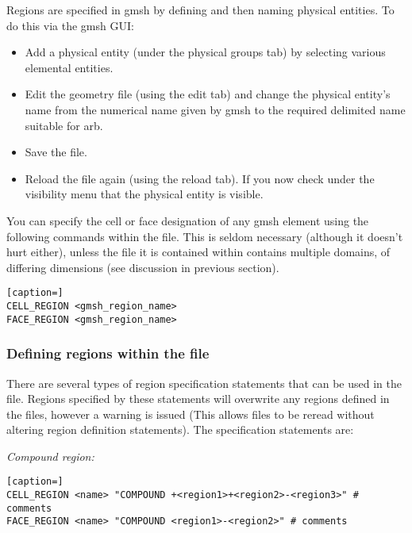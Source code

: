 Regions are specified in gmsh by defining and then naming physical entities.  To do this via the gmsh GUI:
%
\begin{itemize}
\item Add a physical entity (under the physical groups tab) by selecting various elemental entities.
\item Edit the geometry file (using the edit tab) and change the physical entity's name from the numerical name given by gmsh to the required \code{<>} delimited name suitable for arb.
\item Save the  file.
\item Reload the  file again (using the reload tab).  If you now check under the visibility menu that the physical entity is visible.
\end{itemize}

You can specify the cell or face designation of any gmsh element using the following commands within the  file.  This is seldom necessary (although it doesn't hurt either), unless the  file it is contained within contains multiple domains, of differing dimensions (see discussion in previous section).
%
\begin{lstlisting}[caption=]
CELL_REGION <gmsh_region_name> 
FACE_REGION <gmsh_region_name>
\end{lstlisting}

\subsubsection{Defining regions within the  file}

There are several types of region specification statements that can be used in the  file.  Regions specified by these statements will overwrite any regions defined in the  files, however a warning is issued (This allows  files to be reread without altering region definition statements).  The specification statements are:

\emph{Compound region:}

\begin{lstlisting}[caption=]
CELL_REGION <name> "COMPOUND +<region1>+<region2>-<region3>" # comments
FACE_REGION <name> "COMPOUND <region1>-<region2>" # comments
\end{lstlisting}

